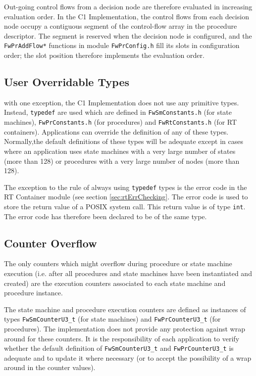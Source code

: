 \documentclass[manual]{../fwprofile}
\begin{document}
Out-going control flows from a decision node are therefore evaluated in increasing evaluation order. In the C1 Implementation, the control flows from each
decision node occupy a contiguous segment of the control-flow array in the procedure descriptor. The segment is reserved when the decision node is configured,
and the \texttt{FwPrAddFlow*} functions in module \texttt{FwPrConfig.h} fill its slots in configuration order; the slot position therefore implements
the evaluation order.

\subsection{User Overridable Types}
with one exception, the C1 Implementation does not use any primitive types. Instead, \texttt{typedef} are used which are defined in \texttt{FwSmConstants.h} (for state machines), \texttt{FwPrConstants.h} (for procedures) and \texttt{FwRtConstants.h} (for RT containers). 
Applications can override the definition of any of these types.
Normally,the default definitions of these types will be adequate except in cases where an application uses state machines with a very large number of states (more than 128) or procedures with a very large number of nodes (more than 128).

The exception to the rule of always using \texttt{typedef} types is the error code in the RT Container module (see section \ref{sec:rtErrChecking}. The error code is used to store the return value of a POSIX system call. This return value is of type \texttt{int}. The error code has therefore been declared to be of the same type.

\subsection{Counter Overflow}
The only counters which might overflow during procedure or state machine execution (i.e. after all 
procedures and state machines have been instantiated and created) are the execution counters
associated to each state machine and procedure instance.

The state machine and procedure execution counters are defined as instances of types 
\texttt{FwSmCounterU3\_t} (for state machines) and \texttt{FwPrCounterU3\_t} (for procedures).
The implementation does not provide any protection against wrap around for these counters. It is the responsibility
of each application to verify whether the default definition of \texttt{FwSmCounterU3\_t} and \texttt{FwPrCounterU3\_t}
is adequate and to update it where necessary (or to accept the possibility of a wrap around in the counter values).
\end{document}
